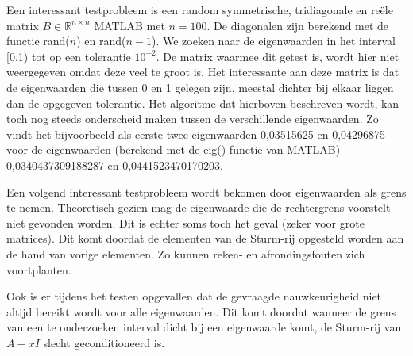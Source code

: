 Een interessant testprobleem is een random symmetrische, tridiagonale en re\"ele matrix $B \in \mathbb{R}^{n \times n}$ MATLAB met $n = 100$. De diagonalen zijn berekend met de functie rand($n$) en rand($n-1$). We zoeken naar de eigenwaarden in het interval [0,1) tot op een tolerantie $10^{-2}$. De matrix waarmee dit getest is, wordt hier niet weergegeven omdat deze veel te groot is. Het interessante aan deze matrix is dat de eigenwaarden die tussen 0 en 1 gelegen zijn, meestal dichter bij elkaar liggen dan de opgegeven tolerantie. Het algoritme dat hierboven beschreven wordt, kan toch nog steeds onderscheid maken tussen de verschillende eigenwaarden. Zo vindt het bijvoorbeeld als eerste twee eigenwaarden 0,03515625 en 0,04296875 voor de eigenwaarden (berekend met de eig() functie van MATLAB) 0,0340437309188287 en 0,0441523470170203.

Een volgend interessant testprobleem wordt bekomen door eigenwaarden als grens te nemen. Theoretisch gezien mag de eigenwaarde die de rechtergrens voorstelt niet gevonden worden. Dit is echter soms toch het geval (zeker voor grote matrices). Dit komt doordat de elementen van de Sturm-rij opgesteld worden aan de hand van vorige elementen. Zo kunnen reken- en afrondingsfouten zich voortplanten.

Ook is er tijdens het testen opgevallen dat de gevraagde nauwkeurigheid niet altijd bereikt wordt voor alle eigenwaarden. Dit komt doordat wanneer de grens van een te onderzoeken interval dicht bij een eigenwaarde komt, de Sturm-rij van $A-xI$ slecht geconditioneerd is.